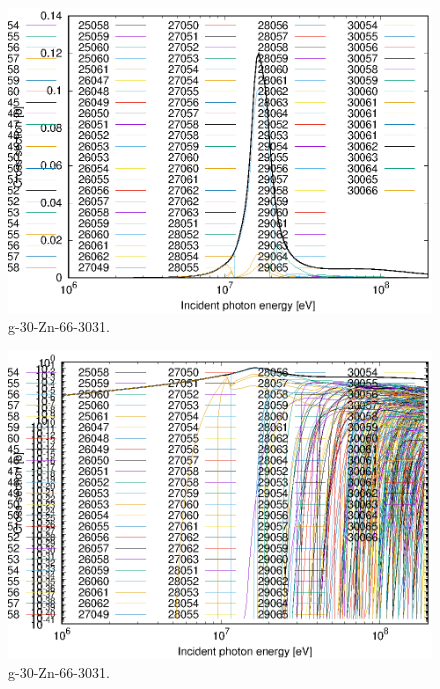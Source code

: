 \begin{figure}
 \includegraphics[width=\linewidth]{eps/g_30-Zn-66_3031.eps}
  \caption{g-30-Zn-66-3031.}
\end{figure}
\begin{figure}
 \includegraphics[width=\linewidth]{eps-log/g_30-Zn-66_3031.eps}
 \caption{g-30-Zn-66-3031.}
\end{figure}
\newpage \clearpage

